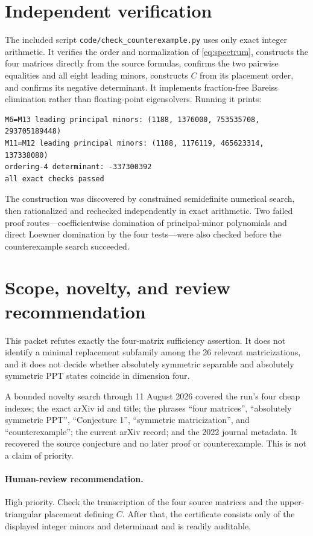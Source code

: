 \documentclass[10pt]{article}
\begin{document}
\section{Independent verification}
The included script \texttt{code/check\_counterexample.py} uses only exact
integer arithmetic.  It verifies the order and normalization of
\eqref{eq:spectrum}, constructs the four matrices directly from the source
formulas, confirms the two pairwise equalities and all eight leading minors,
constructs $C$ from its placement order, and confirms its negative
determinant.  It implements fraction-free Bareiss elimination rather than
floating-point eigensolvers.  Running it prints:
\begin{verbatim}
M6=M13 leading principal minors: (1188, 1376000, 753535708, 293705189448)
M11=M12 leading principal minors: (1188, 1176119, 465623314, 137338080)
ordering-4 determinant: -337300392
all exact checks passed
\end{verbatim}

The construction was discovered by constrained semidefinite numerical search,
then rationalized and rechecked independently in exact arithmetic.  Two failed
proof routes---coefficientwise domination of principal-minor polynomials and
direct Loewner domination by the four tests---were also checked before the
counterexample search succeeded.

\section{Scope, novelty, and review recommendation}
This packet refutes exactly the four-matrix sufficiency assertion.  It does
not identify a minimal replacement subfamily among the 26 relevant
matricizations, and it does not decide whether absolutely symmetric separable
and absolutely symmetric PPT states coincide in dimension four.

A bounded novelty search through 11 August 2026 covered the run's four cheap
indexes; the exact arXiv id and title; the phrases ``four matrices'',
``absolutely symmetric PPT'', ``Conjecture 1'', ``symmetric matricization'',
and ``counterexample''; the current arXiv record; and the 2022 journal
metadata.  It recovered the source conjecture and no later proof or
counterexample.  This is not a claim of priority.

\paragraph{Human-review recommendation.}
High priority.  Check the transcription of the four source matrices and the
upper-triangular placement defining $C$.  After that, the certificate consists
only of the displayed integer minors and determinant and is readily auditable.
\end{document}
